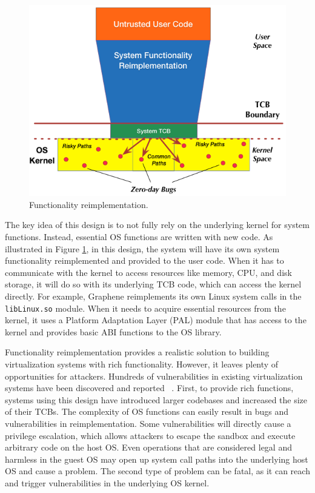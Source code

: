\begin{figure}%
\centering
\includegraphics[width=1.0\columnwidth]{diagram/Virtualization_Design_Model_02.png}
\caption{\small Functionality reimplementation.}
\label{fig:design_functionality_reimplementation}
\end{figure}

The key idea of this design is to not fully rely on the underlying
kernel for system functions. Instead, essential OS functions are written with new
code. As illustrated in Figure \ref{fig:design_functionality_reimplementation},
in this design, the system will have its own system functionality reimplemented and
provided to the user code. When it has to communicate with the kernel
to access resources like memory, CPU, and disk storage, it will do so with
its underlying TCB code, which can access the kernel directly.
For example, Graphene \cite{Graphene-14} reimplements
its own Linux system calls in the
\texttt{libLinux.so} module. When it needs to acquire essential resources from
the kernel, it uses a
Platform Adaptation Layer (PAL)  module that has access to the kernel
and provides basic ABI functions to the OS library.

Functionality reimplementation provides a
realistic solution to building virtualization systems
with rich functionality. However, it
leaves plenty of opportunities for attackers.
Hundreds of vulnerabilities in existing virtualization systems have been discovered and reported ~\cite{NVD}.
First, to provide rich functions, systems using this design have
introduced larger codebases and increased the size of their TCBs.
The complexity of OS functions can easily result in bugs and vulnerabilities in
reimplementation. Some vulnerabilities
will directly cause a privilege escalation, which allows attackers to escape the sandbox
and execute arbitrary code on the host OS.
Even operations that are considered
legal and harmless in the guest OS may open up system call paths into the underlying
host OS and cause a problem.
The second type of problem can be fatal, as it can reach and
trigger vulnerabilities in the underlying OS kernel.

